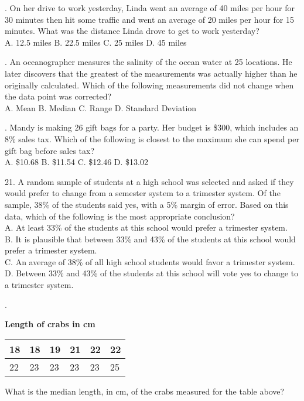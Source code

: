 \documentclass[../satmath.tex]{subfiles}
\begin{document}
. On her drive to work yesterday, Linda went an average of 40 miles per hour for 30 minutes then hit some traffic and went an average 
of 20 miles per hour for 15 minutes. What was the distance Linda drove to get to work yesterday?\\
A. 12.5 miles \quad B. 22.5 miles \quad C. 25 miles \quad D. 45 miles 

. An oceanographer measures the salinity of the ocean water at 25 locations. He later discovers that the greatest of the measurements was 
actually higher than he originally calculated. Which of the following measurements did not change when the data point was corrected?\\
A. Mean \quad B. Median \quad C. Range \quad D. Standard Deviation 

. Mandy is making 26 gift bags for a party. Her budget is \$300, which includes an 8\% sales tax. Which of the following is closest to the 
maximum she can spend per gift bag before sales tax?\\
A. \$10.68 \quad B. \$11.54 \quad C. \$12.46 \quad D. \$13.02
\medbreak 

21. A random sample of students at a high school was selected and asked if they would prefer to change from a semester system to a trimester 
system. Of the sample, 38\% of the students said yes, with a 5\% margin of error. Based on this data, which of the following is the most appropriate conclusion?\\
A. At least 33\% of the students at this school would prefer a trimester system.\\
B. It is plausible that between 33\% and 43\% of the students at this school would prefer a trimester system.\\
C. An average of 38\% of all high school students would favor a trimester system.\\
D. Between 33\% and 43\% of the students at this school will vote yes to change to a trimester system.

. 
\begin{center}
    \textbf{Length of crabs in cm}
\end{center}
\begin{table}[h]
    \centering
    \begin{tabular}{|l|l|l|l|l|l|}
    \hline
    18 & 18 & 19 & 21 & 22 & 22 \\ \hline
    22 & 23 & 23 & 23 & 23 & 25 \\ \hline
    \end{tabular}
\end{table}
What is the median length, in cm, of the crabs measured for the table above?
\end{document}
